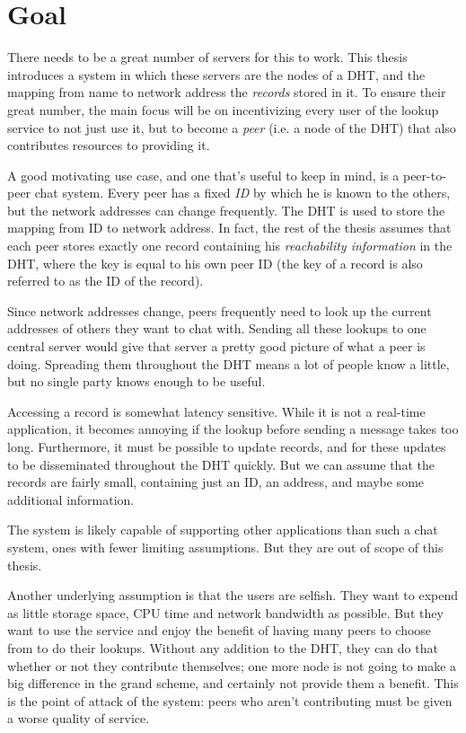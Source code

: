 \section{Goal}
There needs to be a great number of servers for this to work. This thesis
introduces a system in which these servers are the nodes of a \ac{DHT}, and the
mapping from name to network address the \emph{records} stored in it. To ensure
their great number, the main focus will be on incentivizing every user of the
lookup service to not just use it, but to become a \emph{peer} (i.e. a node of
the \ac{DHT}) that also contributes resources to providing it.

A good motivating use case, and one that's useful to keep in mind, is a
peer-to-peer chat system. Every peer has a fixed \emph{ID} by which he is known
to the others, but the network addresses can change frequently. The \ac{DHT} is
used to store the mapping from ID to network address. In fact, the rest of the
thesis assumes that each peer stores exactly one record containing his
\emph{reachability information} in the \ac{DHT}, where the key is equal to his
own peer ID (the key of a record is also referred to as the ID of the record).

Since network addresses change, peers frequently need to look up the current
addresses of others they want to chat with. Sending all these lookups to one
central server would give that server a pretty good picture of what a peer is
doing. Spreading them throughout the \ac{DHT} means a lot of people know a
little, but no single party knows enough to be useful.

Accessing a record is somewhat latency sensitive. While it is not a real-time
application, it becomes annoying if the lookup before sending a message takes
too long. Furthermore, it must be possible to update records, and for these
updates to be disseminated throughout the \ac{DHT} quickly. But we can assume
that the records are fairly small, containing just an ID, an address, and maybe
some additional information.

The system is likely capable of supporting other applications than such a chat
system, ones with fewer limiting assumptions. But they are out of scope of this
thesis.

Another underlying assumption is that the users are selfish. They want to expend
as little storage space, CPU time and network bandwidth as possible. But they
want to use the service and enjoy the benefit of having many peers to choose
from to do their lookups. Without any addition to the \ac{DHT}, they can do that
whether or not they contribute themselves; one more node is not going to make a
big difference in the grand scheme, and certainly not provide them a benefit.
This is the point of attack of the system: peers who aren't contributing must be
given a worse quality of service.

